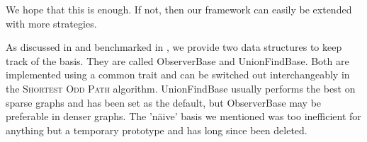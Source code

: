 We hope that this is enough. If not, then our framework can easily be extended with more strategies.

As discussed in  and benchmarked in , we provide two data structures to keep track of the basis. They are called ObserverBase and UnionFindBase. Both are implemented using a common trait and can be switched out interchangeably in the \textsc{Shortest Odd Path} algorithm. UnionFindBase usually performs the best on sparse graphs and has been set as the default, but ObserverBase may be preferable in denser graphs. The 'näive' basis we mentioned was too inefficient for anything but a temporary prototype and has long since been deleted.
